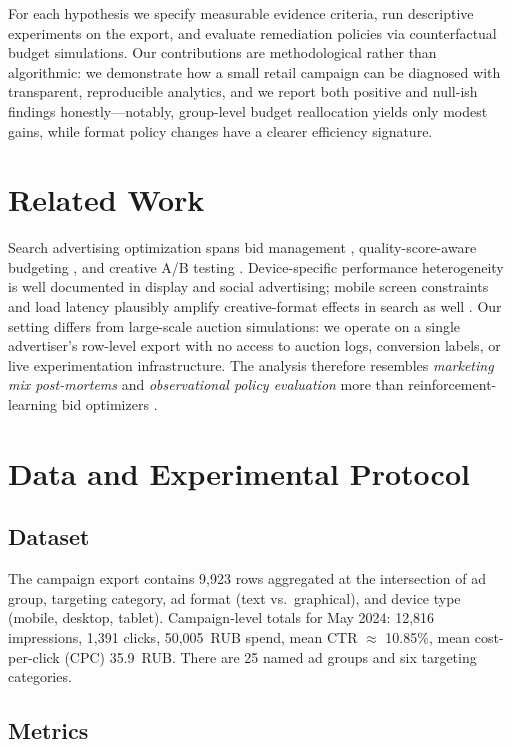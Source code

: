 \documentclass{article}
\begin{document}
For each hypothesis we specify measurable evidence criteria, run descriptive experiments on the export, and evaluate remediation policies via counterfactual budget simulations. Our contributions are methodological rather than algorithmic: we demonstrate how a small retail campaign can be diagnosed with transparent, reproducible analytics, and we report both positive and null-ish findings honestly---notably, group-level budget reallocation yields only modest gains, while format policy changes have a clearer efficiency signature.

\section{Related Work}

Search advertising optimization spans bid management \cite{edelman2007internet}, quality-score-aware budgeting \cite{ghosh2009ad}, and creative A/B testing \cite{blake2015consumer}. Device-specific performance heterogeneity is well documented in display and social advertising; mobile screen constraints and load latency plausibly amplify creative-format effects in search as well \cite{ghose2013mobile}. Our setting differs from large-scale auction simulations: we operate on a single advertiser's row-level export with no access to auction logs, conversion labels, or live experimentation infrastructure. The analysis therefore resembles \emph{marketing mix post-mortems} and \emph{observational policy evaluation} more than reinforcement-learning bid optimizers \cite{nuara2018combinatorial}.

\section{Data and Experimental Protocol}

\subsection{Dataset}

The campaign export contains 9{,}923 rows aggregated at the intersection of ad group, targeting category, ad format (text vs.\ graphical), and device type (mobile, desktop, tablet). Campaign-level totals for May 2024: 12{,}816 impressions, 1{,}391 clicks, 50{,}005~RUB spend, mean CTR $\approx$ 10.85\%, mean cost-per-click (CPC) 35.9~RUB. There are 25 named ad groups and six targeting categories.

\subsection{Metrics}
\end{document}
